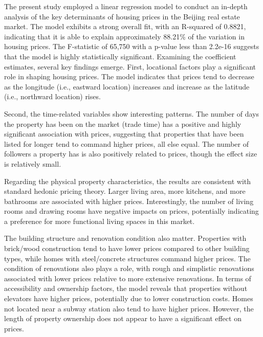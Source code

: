 \documentclass[
  letterpaper,
  DIV=11,
  numbers=noendperiod]{scrartcl}
\begin{document}
The present study employed a linear regression model to conduct an
in-depth analysis of the key determinants of housing prices in the
Beijing real estate market. The model exhibits a strong overall fit,
with an R-squared of 0.8821, indicating that it is able to explain
approximately 88.21\% of the variation in housing prices. The
F-statistic of 65,750 with a p-value less than 2.2e-16 suggests that the
model is highly statistically significant. Examining the coefficient
estimates, several key findings emerge. First, locational factors play a
significant role in shaping housing prices. The model indicates that
prices tend to decrease as the longitude (i.e., eastward location)
increases and increase as the latitude (i.e., northward location) rises.

Second, the time-related variables show interesting patterns. The number
of days the property has been on the market (trade time) has a positive
and highly significant association with prices, suggesting that
properties that have been listed for longer tend to command higher
prices, all else equal. The number of followers a property has is also
positively related to prices, though the effect size is relatively
small.

Regarding the physical property characteristics, the results are
consistent with standard hedonic pricing theory. Larger living area,
more kitchens, and more bathrooms are associated with higher prices.
Interestingly, the number of living rooms and drawing rooms have
negative impacts on prices, potentially indicating a preference for more
functional living spaces in this market.

The building structure and renovation condition also matter. Properties
with brick/wood construction tend to have lower prices compared to other
building types, while homes with steel/concrete structures command
higher prices. The condition of renovations also plays a role, with
rough and simplistic renovations associated with lower prices relative
to more extensive renovations. In terms of accessibility and ownership
factors, the model reveals that properties without elevators have higher
prices, potentially due to lower construction costs. Homes not located
near a subway station also tend to have higher prices. However, the
length of property ownership does not appear to have a significant
effect on prices.
\end{document}
